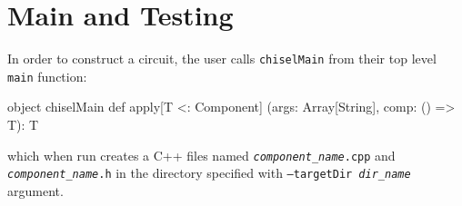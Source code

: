\documentclass[10pt,twocolumn]{article}
\def\code#1{{\small\tt #1}}
\begin{document}
\section{Main and Testing}

In order to construct a circuit, 
the user calls \code{chiselMain} from their top level \code{main} function:

\begin{scala}
object chiselMain {
  def apply[T <: Component]
    (args: Array[String], comp: () => T): T
}
\end{scala}

\noindent
which when run creates a C++ files named
\code{{\it component\_name}.cpp} and \code{{\it component\_name}.h} in
the directory specified with
\code{--targetDir {\it dir\_name}} argument.

% 
% 
% 
% 
% 
% 
% 
% 
% 
\end{document}
